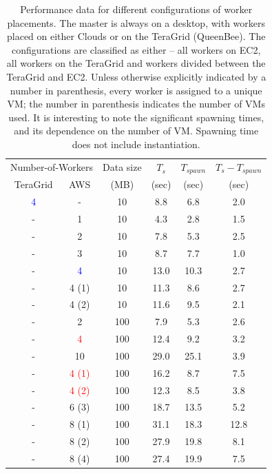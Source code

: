\documentclass[conference,final]{IEEEtran}
\newcommand{\upp}{\vspace*{-0.5em}}
\begin{document}
\begin{table}
\upp
\begin{tabular}{cccccc}
  \hline
  \multicolumn{2}{c}{Number-of-Workers}  &  Data size   &  $T_s$  & $T_{spawn}$ & $T_s - T_{spawn}$\\   
  TeraGrid &  AWS &   (MB)  & (sec) & (sec)  & (sec) \\
  \hline
  \textcolor{blue}{4} & - & 10  &  8.8 &  6.8 & 2.0 \\
  \hline 
  - & 1 & 10 & 4.3 & 2.8 & 1.5 \\
  - & 2 & 10 & 7.8 & 5.3 & 2.5 \\ 
  - & 3 & 10 & 8.7 & 7.7 & 1.0 \\
  - & \textcolor{blue}{4} & 10 & 13.0 & 10.3 & 2.7 \\
  - & 4 (1) & 10 & 11.3 & 8.6 & 2.7 \\
  - & 4 (2) & 10 & 11.6 & 9.5 & 2.1 \\
\hline \hline
  -  & 2  & 100 & 7.9  & 5.3 & 2.6 \\
   -  & \textcolor{red}{4}  & 100 & 12.4 & 9.2 & 3.2\\
  -  & 10 & 100 & 29.0 & 25.1 & 3.9 \\
 \hline \hline
  - & \textcolor{red}{4 (1)} & 100 & 16.2 & 8.7 & 7.5 \\ 
 - & \textcolor{red}{4 (2)} & 100 & 12.3 & 8.5 & 3.8 \\
  - & 6 (3) & 100 & 18.7 & 13.5 & 5.2\\
  - & 8 (1) & 100 & 31.1 & 18.3 & 12.8 \\
  - & 8 (2) & 100 & 27.9 & 19.8 & 8.1\\
  - & 8 (4) & 100 & 27.4 & 19.9 & 7.5\\
  \hline \hline
\end{tabular}
\upp
\caption{Performance data for different configurations of worker placements. The master is always on a desktop, with workers placed on either Clouds or on the TeraGrid (QueenBee). The configurations are classified as either -- all workers on EC2, all workers on the TeraGrid and workers divided between the TeraGrid and EC2. Unless otherwise explicitly indicated
  by a number in parenthesis, every worker is assigned to a unique VM; the number  in parenthesis indicates the number of VMs used. It is interesting to note the significant spawning times, and its dependence on the number of VM. Spawning time does not include instantiation.}
\label{stuff}
\upp
\upp
\end{table}
\end{document}
